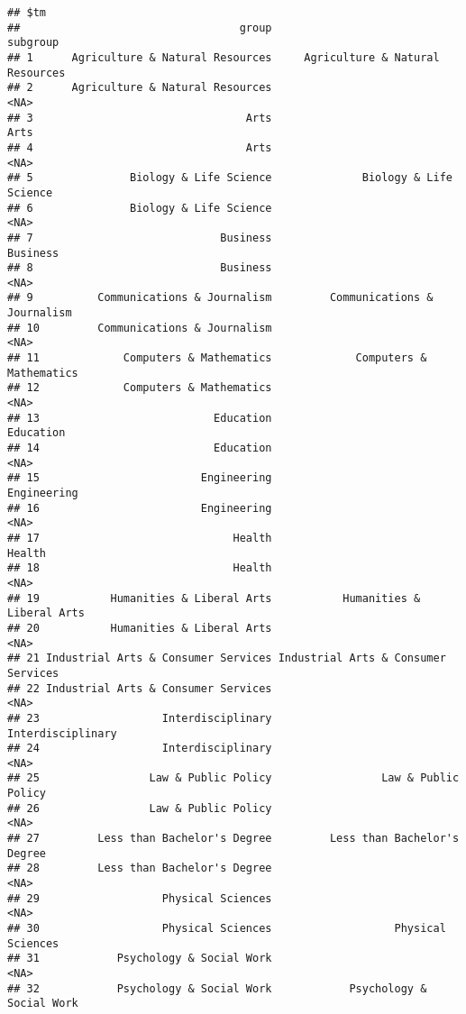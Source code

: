 \documentclass[
]{article}
\begin{document}
\begin{verbatim}
## $tm
##                                  group                            subgroup
## 1      Agriculture & Natural Resources     Agriculture & Natural Resources
## 2      Agriculture & Natural Resources                                <NA>
## 3                                 Arts                                Arts
## 4                                 Arts                                <NA>
## 5               Biology & Life Science              Biology & Life Science
## 6               Biology & Life Science                                <NA>
## 7                             Business                            Business
## 8                             Business                                <NA>
## 9          Communications & Journalism         Communications & Journalism
## 10         Communications & Journalism                                <NA>
## 11             Computers & Mathematics             Computers & Mathematics
## 12             Computers & Mathematics                                <NA>
## 13                           Education                           Education
## 14                           Education                                <NA>
## 15                         Engineering                         Engineering
## 16                         Engineering                                <NA>
## 17                              Health                              Health
## 18                              Health                                <NA>
## 19           Humanities & Liberal Arts           Humanities & Liberal Arts
## 20           Humanities & Liberal Arts                                <NA>
## 21 Industrial Arts & Consumer Services Industrial Arts & Consumer Services
## 22 Industrial Arts & Consumer Services                                <NA>
## 23                   Interdisciplinary                   Interdisciplinary
## 24                   Interdisciplinary                                <NA>
## 25                 Law & Public Policy                 Law & Public Policy
## 26                 Law & Public Policy                                <NA>
## 27         Less than Bachelor's Degree         Less than Bachelor's Degree
## 28         Less than Bachelor's Degree                                <NA>
## 29                   Physical Sciences                                <NA>
## 30                   Physical Sciences                   Physical Sciences
## 31            Psychology & Social Work                                <NA>
## 32            Psychology & Social Work            Psychology & Social Work

\end{verbatim}
\end{document}
